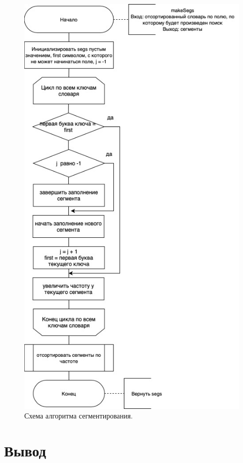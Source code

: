 \documentclass[12pt]{report}
\begin{document}
	\begin{figure}[H]
		\centering
		\includegraphics[scale=0.6]{scheme-makeSegs.jpg}
		\caption{Схема алгоритма сегментирования.}
		\label{fig:seg}
	\end{figure}
	
	
	\section*{Вывод}
	
\end{document}
